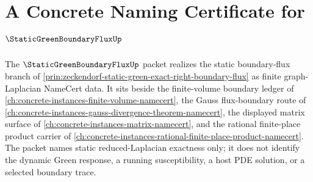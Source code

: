\chapter{A Concrete Naming Certificate for $\StaticGreenBoundaryFluxUp$}
\label{ch:concrete-instances-static-green-boundary-flux-namecert}

The $\StaticGreenBoundaryFluxUp$ packet realizes the static boundary-flux branch of \autoref{prin:zeckendorf-static-green-exact-right-boundary-flux} as finite graph-Laplacian NameCert data. It sits beside the finite-volume boundary ledger of \autoref{ch:concrete-instances-finite-volume-namecert}, the Gauss flux-boundary route of \autoref{ch:concrete-instances-gauss-divergence-theorem-namecert}, the displayed matrix surface of \autoref{ch:concrete-instances-matrix-namecert}, and the rational finite-place product carrier of \autoref{ch:concrete-instances-rational-finite-place-product-namecert}. The packet names static reduced-Laplacian exactness only; it does not identify the dynamic Green response, a running susceptibility, a host PDE solution, or a selected boundary trace.

